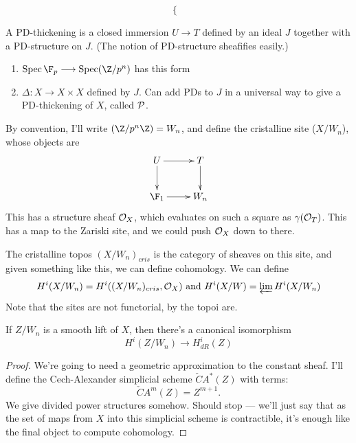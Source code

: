 \documentclass[11pt]{article}
\begin{document}
\begin{SaulCrystallineCohomology}
\begin{exmp*}
\[\begin{cases}
\end{cases}\]
\end{exmp*}
\begin{defn*}
A PD-thickening is a closed immersion $U\to T$ defined by an ideal $J$ together with a PD-structure on $J$. (The notion of PD-structure sheafifies easily.)
\end{defn*}
\begin{exmp*}
\begin{enumerate}\squishlist
\item $\spec\F_p\to\spec(\Z/p^n)$ has this form
\item $\Delta:X\to X\times X$ defined by $J$. Can add PDs to $J$ in a universal way to give a PD-thickening of $X$, called $\mathcal{P}$.
\end{enumerate}

By convention, I'll write $(\Z/p^n\Z)=W_n$, and define the cristalline site ($X/W_n$), whose objects are
\[\xymatrix{
 U\ar[r]\ar[d]&\ar[d] T\\
 \F_1\ar[r]&W_n
}\]
This has a structure sheaf $\mathcal{O}_X$, which evaluates on such a square as $\gamma(\mathcal{O}_T)$. This has a map to the Zariski site, and we could push $\mathcal{O}_X$ down to there.
\end{exmp*}
The cristalline topos $(X/W_n)_{cris}$ is the category of sheaves on this site, and given something like this, we can define cohomology. We can define
\[H^i(X/W_n)=H^i((X/W_n)_{cris},\mathcal{O}_X)\textup{ and }H^i(X/W)=\varprojlim H^i(X/W_n)\]
Note that the sites are not functorial, by the topoi are.
\begin{thm*}[Berthelot]
If $Z/W_n$ is a smooth lift of $X$, then there's a canonical isomorphism
\[H^i(Z/W_n)\to H^i_{dR}(Z)\]
\end{thm*}
\begin{proof}
We're going to need a geometric approximation to the constant sheaf. I'll define the Cech-Alexander simplicial scheme $\check{C}A^*(Z)$ with terms:
\[\check{C}A^m(Z)=Z^{m+1}.\]
We give divided power structures somehow. Should stop --- we'll just say that as the set of maps from $X$ into this simplicial scheme is contractible, it's enough like the final object to compute cohomology.
\end{proof}

\pagebreak
\end{SaulCrystallineCohomology}
\end{document}
